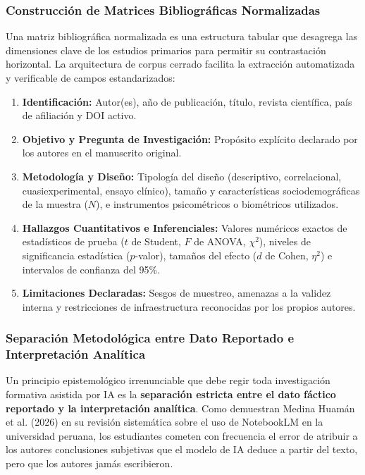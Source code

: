 \subsubsection{Construcción de Matrices Bibliográficas Normalizadas}

Una matriz bibliográfica normalizada es una estructura tabular que desagrega las dimensiones clave de los estudios primarios para permitir su contrastación horizontal. La arquitectura de corpus cerrado facilita la extracción automatizada y verificable de campos estandarizados:

\begin{enumerate}
    \item \textbf{Identificación:} Autor(es), año de publicación, título, revista científica, país de afiliación y DOI activo.
    \item \textbf{Objetivo y Pregunta de Investigación:} Propósito explícito declarado por los autores en el manuscrito original.
    \item \textbf{Metodología y Diseño:} Tipología del diseño (descriptivo, correlacional, cuasiexperimental, ensayo clínico), tamaño y características sociodemográficas de la muestra ($N$), e instrumentos psicométricos o biométricos utilizados.
    \item \textbf{Hallazgos Cuantitativos e Inferenciales:} Valores numéricos exactos de estadísticos de prueba ($t$ de Student, $F$ de ANOVA, $\chi^2$), niveles de significancia estadística ($p$-valor), tamaños del efecto ($d$ de Cohen, $\eta^2$) e intervalos de confianza del 95\%.
    \item \textbf{Limitaciones Declaradas:} Sesgos de muestreo, amenazas a la validez interna y restricciones de infraestructura reconocidas por los propios autores.
\end{enumerate}

\subsubsection{Separación Metodológica entre Dato Reportado e Interpretación Analítica}

Un principio epistemológico irrenunciable que debe regir toda investigación formativa asistida por IA es la \textbf{separación estricta entre el dato fáctico reportado y la interpretación analítica}. Como demuestran Medina Huamán et al. (2026) en su revisión sistemática sobre el uso de NotebookLM en la universidad peruana, los estudiantes cometen con frecuencia el error de atribuir a los autores conclusiones subjetivas que el modelo de IA deduce a partir del texto, pero que los autores jamás escribieron.

